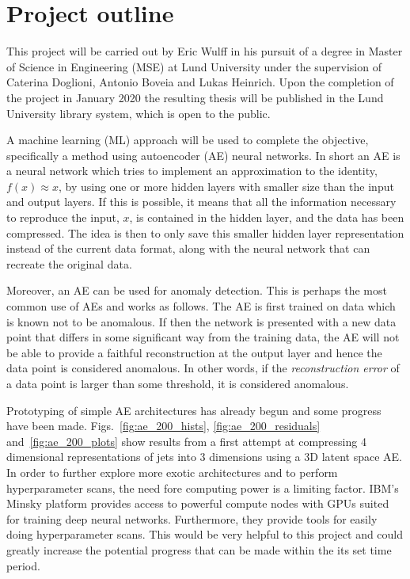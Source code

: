 \documentclass[11pt]{article}
\begin{document}
\section{Project outline}

This project will be carried out by Eric Wulff in his pursuit of a degree in Master of Science in Engineering (MSE) at Lund University under the supervision of Caterina Doglioni, Antonio Boveia and Lukas Heinrich. Upon the completion of the project in January 2020 the resulting thesis will be published in the Lund University library system, which is open to the public.

A machine learning (ML) approach will be used to complete the objective, specifically a method using autoencoder (AE) neural networks. In short an AE is a neural network which tries to implement an approximation to the identity, $f(x) \approx x$, by using one or more hidden layers with smaller size than the input and output layers. If this is possible, it means that all the information necessary to reproduce the input, $x$, is contained in the hidden layer, and the data has been compressed. The idea is then to only save this smaller hidden layer representation instead of the current data format, along with the neural network that can recreate the original data. 

Moreover, an AE can be used for anomaly detection. This is perhaps the most common use of AEs and works as follows. The AE is first trained on data which is known not to be anomalous. If then the network is presented with a new data point that differs in some significant way from the training data, the AE will not be able to provide a faithful reconstruction at the output layer and hence the data point is considered anomalous. In other words, if the \emph{reconstruction error} of a data point is larger than some threshold, it is considered anomalous.

Prototyping of simple AE architectures has already begun and some progress have been made. Figs.~\ref{fig:ae_200_hists}, \ref{fig:ae_200_residuals} and~\ref{fig:ae_200_plots} show results from a first attempt at compressing 4 dimensional representations of jets into 3 dimensions using a 3D latent space AE. In order to further explore more exotic architectures and to perform hyperparameter scans, the need fore computing power is a limiting factor. IBM's Minsky platform provides access to powerful compute nodes with GPUs suited for training deep neural networks. Furthermore, they provide tools for easily doing hyperparameter scans. This would be very helpful to this project and could greatly increase the potential progress that can be made within the its set time period.
\end{document}
